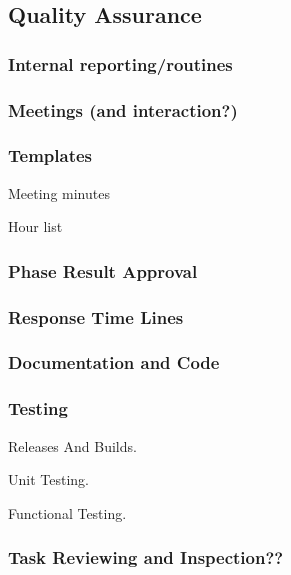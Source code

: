 \subsection{Quality Assurance}

\subsubsection{Internal reporting/routines}

\subsubsection{Meetings (and interaction?)}

\subsubsection{Templates}

Meeting minutes

Hour list


\subsubsection{Phase Result Approval}

\subsubsection{Response Time Lines}

\subsubsection{Documentation and Code}

\subsubsection{Testing}

Releases And Builds.

Unit Testing.

Functional Testing.

\subsubsection{Task Reviewing and Inspection??}




